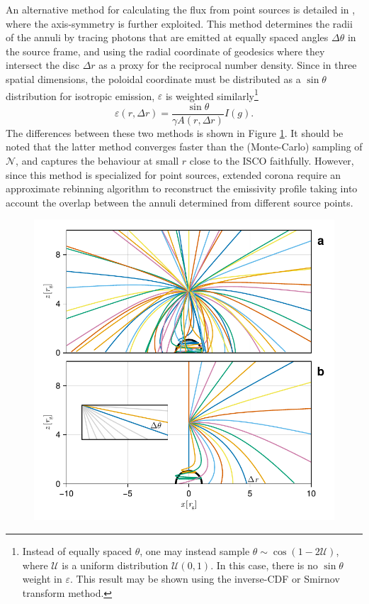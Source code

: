 An alternative method for calculating the flux from point sources is detailed in \cite{dauser_irradiation_2013}, where the axis-symmetry is further exploited. This method determines the radii of the annuli by tracing photons that are emitted at equally spaced angles $\Delta \theta$ in the source frame, and using the radial coordinate of geodesics where they intersect the disc $\Delta r$ as a proxy for the reciprocal number density. Since in three spatial dimensions, the poloidal coordinate must be distributed as a $\sin \theta$ distribution for isotropic emission, $\varepsilon$ is weighted similarly\footnote{Instead of equally spaced $\theta$, one may instead sample $\theta \sim \cos (1 - 2 \mathcal{U})$, where $\mathcal{U}$ is a uniform distribution $\mathcal{U}(0,1)$. In this case, there is no $\sin \theta$ weight in $\varepsilon$. This result may be shown using the inverse-CDF or Smirnov transform method.}
\begin{equation}
    \varepsilon(r, \Delta r) = \frac{\sin \theta}{\gamma A(r, \Delta r)} I(g).
\end{equation}
The differences between these two methods is shown in Figure \ref{fig:coronal-tracing}. It should be noted that the latter method converges faster than the (Monte-Carlo) sampling of $\mathcal{N}$, and captures the behaviour at small $r$ close to the ISCO faithfully. However, since this method is specialized for point sources, extended corona require an approximate rebinning algorithm to reconstruct the emissivity profile taking into account the overlap between the annuli determined from different source points.

\begin{figure}
    \centering
    \includegraphics[width=0.95\linewidth]{figures/emissivity.coronal-traces.pdf}
    \caption{}
    \label{fig:coronal-tracing}
\end{figure}

